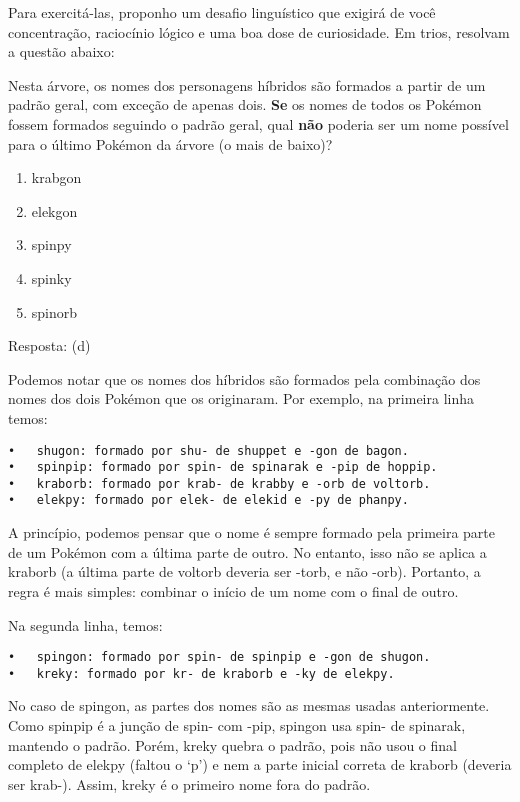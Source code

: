 \documentclass[
  letterpaper,
  DIV=11,
  numbers=noendperiod]{scrreprt}
\providecommand{\tightlist}{%
  \setlength{\itemsep}{0pt}\setlength{\parskip}{0pt}}
\begin{document}
Para exercitá-las, proponho um desafio linguístico que exigirá de você
concentração, raciocínio lógico e uma boa dose de curiosidade. Em trios,
resolvam a questão abaixo:

Nesta árvore, os nomes dos personagens híbridos são formados a partir de
um padrão geral, com exceção de apenas dois. \textbf{Se} os nomes de
todos os Pokémon fossem formados seguindo o padrão geral, qual
\textbf{não} poderia ser um nome possível para o último Pokémon da
árvore (o mais de baixo)?

\begin{enumerate}
\def\labelenumi{\alph{enumi})}
\tightlist
\item
  krabgon
\item
  elekgon
\item
  spinpy
\item
  spinky
\item
  spinorb
\end{enumerate}

Resposta: (d)

Podemos notar que os nomes dos híbridos são formados pela combinação dos
nomes dos dois Pokémon que os originaram. Por exemplo, na primeira linha
temos:

\begin{verbatim}
•   shugon: formado por shu- de shuppet e -gon de bagon.
•   spinpip: formado por spin- de spinarak e -pip de hoppip.
•   kraborb: formado por krab- de krabby e -orb de voltorb.
•   elekpy: formado por elek- de elekid e -py de phanpy.
\end{verbatim}

A princípio, podemos pensar que o nome é sempre formado pela primeira
parte de um Pokémon com a última parte de outro. No entanto, isso não se
aplica a kraborb (a última parte de voltorb deveria ser -torb, e não
-orb). Portanto, a regra é mais simples: combinar o início de um nome
com o final de outro.

Na segunda linha, temos:

\begin{verbatim}
•   spingon: formado por spin- de spinpip e -gon de shugon.
•   kreky: formado por kr- de kraborb e -ky de elekpy.
\end{verbatim}

No caso de spingon, as partes dos nomes são as mesmas usadas
anteriormente. Como spinpip é a junção de spin- com -pip, spingon usa
spin- de spinarak, mantendo o padrão. Porém, kreky quebra o padrão, pois
não usou o final completo de elekpy (faltou o `p') e nem a parte inicial
correta de kraborb (deveria ser krab-). Assim, kreky é o primeiro nome
fora do padrão.
\end{document}
